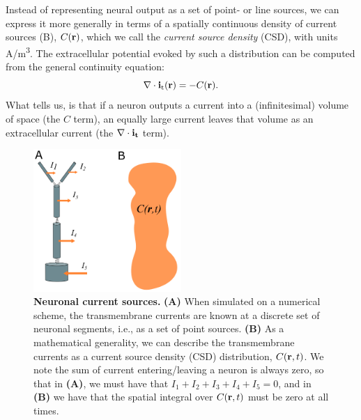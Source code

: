 \section{}
\label{sec:VC:CSD}
Instead of representing neural output as a set of point- or line sources, 
we can express it more generally in terms of a spatially continuous density 
of current sources (B), $C({\bf r})$, 
which we call the \textit{current source density} (CSD), 
with units \si{A/m^3}. 
The extracellular potential evoked by such a distribution can be computed 
from the general continuity equation:
\begin{equation}
\nabla \cdot {\bf i_\mathrm{t}}({\bf r}) = - C({\bf r}).
\label{eq:VC:CSD1}
\end{equation}
What  tells us, is that if a neuron outputs a current into a (infinitesimal) 
volume of space (the $C$ term), an equally large current leaves that volume as an 
extracellular current (the $\nabla \cdot {\bf i_t}$ term).

\begin{figure}[!ht]
\begin{center}
\includegraphics[width=0.5\textwidth]{Figures/VC/CSD.png}
\end{center}
\caption{\textbf{Neuronal current sources.}  
{\bf (A)} When simulated on a numerical scheme, the transmembrane currents 
are known at a discrete set of neuronal segments, i.e., as a set of point sources.  
{\bf (B)} As a mathematical generality, we can describe the transmembrane currents 
as a current source density (CSD) distribution, $C({\bf r},t)$. 
We note the sum of current entering/leaving a neuron is always zero, 
so that in {\bf (A)}, we must have that $I_1 + I_2 + I_3 + I_4 + I_5= 0$, 
and in {\bf (B)} we have that the spatial integral over $C({\bf r},t)$ 
must be zero at all times.
}
\label{fig:VC:CSD}
\end{figure}


